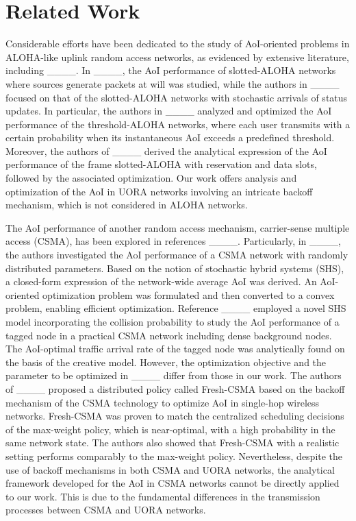 \section{Related Work}
Considerable efforts have been dedicated to the study of AoI-oriented problems in ALOHA-like uplink random access networks, as evidenced by extensive literature, including ____. 
In ____, the AoI performance of slotted-ALOHA networks where sources generate packets at will was studied, while the authors in ____ focused on that of the slotted-ALOHA networks with stochastic arrivals of status updates.
In particular, the authors in ____ analyzed and optimized the AoI performance of the threshold-ALOHA networks, where each user transmits with a certain probability when its instantaneous AoI exceeds a predefined threshold. 
Moreover, the authors of ____ derived the analytical expression of the AoI performance of the frame slotted-ALOHA with reservation and data slots, followed by the associated optimization.
Our work offers analysis and optimization of the AoI in UORA networks involving an intricate backoff mechanism, which is not considered in ALOHA networks.

The AoI performance of another random access mechanism, carrier-sense multiple access (CSMA), has been explored in references ____. 
Particularly, in ____, the authors investigated the AoI performance of a CSMA network with randomly distributed parameters.
Based on the notion of stochastic hybrid systems (SHS), a closed-form expression of the network-wide average AoI was derived.
An AoI-oriented optimization problem was formulated and then converted to a convex problem, enabling efficient optimization.
Reference ____ employed a novel SHS model incorporating the collision probability to study the AoI performance of a tagged node in a practical CSMA network including dense background nodes.
The AoI-optimal traffic arrival rate of the tagged node was analytically found on the basis of the creative model.
However, the optimization objective and the parameter to be optimized in ____ differ from those in our work.
The authors of ____ proposed a distributed policy called Fresh-CSMA based on the backoff mechanism of the CSMA technology to optimize AoI in single-hop wireless networks.
Fresh-CSMA was proven to match the centralized scheduling decisions of the max-weight policy, which is near-optimal, with a high probability in the same network state.
The authors also showed that Fresh-CSMA with a realistic setting performs comparably to the max-weight policy.
Nevertheless, despite the use of backoff mechanisms in both CSMA and UORA networks, the analytical framework developed for the AoI in CSMA networks cannot be directly applied to our work. This is due to the fundamental differences in the transmission processes between CSMA and UORA networks.

